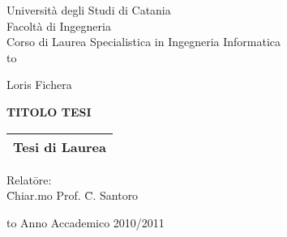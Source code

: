 \begin{titlepage}
\begin{center}
  {\Large \sc Universit\`a degli Studi di Catania}\\
  {\large \sc Facolt\`a di Ingegneria}\\
  {\sc Corso di Laurea Specialistica in Ingegneria Informatica}\\
  
  \hbox to \textwidth{\hrulefill}
  
  \vspace{1.8truecm}
  
  {\large \sc Loris Fichera}
  
  \vspace{1.8truecm}
  
  {\large\sc \uppercase{\textbf{Titolo tesi}}} %
  
  \vspace{1.7truecm}
  
  \begin{tabular}{c}
    \hline
        {\sc Tesi di Laurea}\\
        \hline
  \end{tabular}

  \vspace{1.7truecm}
  
  \begin{minipage}{\textwidth}
    \begin{flushright}
      \begin{minipage}{0.3\textwidth}
        \begin{tabbing}
          Relat\=ore:\\
          \>  \=Chiar.mo Prof. \= {\sc C. Santoro}
        \end{tabbing}
      \end{minipage}
    \end{flushright}
  \end{minipage}
  
  
  \hbox to \textwidth{\hrulefill}
        {\sc Anno Accademico 2010/2011}        
\end{center}
\end{titlepage}

\endinput
